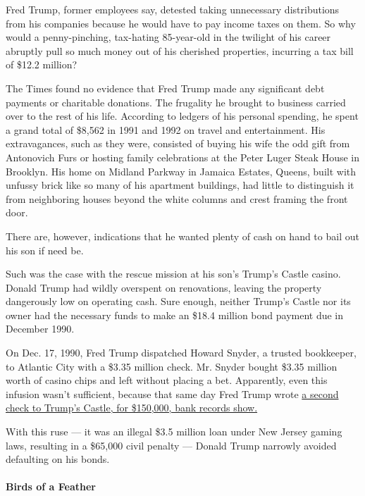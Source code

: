 Fred Trump, former employees say, detested taking unnecessary
distributions from his companies because he would have to pay income
taxes on them. So why would a penny-pinching, tax-hating 85-year-old in
the twilight of his career abruptly pull so much money out of his
cherished properties, incurring a tax bill of \$12.2 million?

The Times found no evidence that Fred Trump made any significant debt
payments or charitable donations. The frugality he brought to business
carried over to the rest of his life. According to ledgers of his
personal spending, he spent a grand total of \$8,562 in 1991 and 1992 on
travel and entertainment. His extravagances, such as they were,
consisted of buying his wife the odd gift from Antonovich Furs or
hosting family celebrations at the Peter Luger Steak House in Brooklyn.
His home on Midland Parkway in Jamaica Estates, Queens, built with
unfussy brick like so many of his apartment buildings, had little to
distinguish it from neighboring houses beyond the white columns and
crest framing the front door.

There are, however, indications that he wanted plenty of cash on hand to
bail out his son if need be.

Such was the case with the rescue mission at his son's Trump's Castle
casino. Donald Trump had wildly overspent on renovations, leaving the
property dangerously low on operating cash. Sure enough, neither Trump's
Castle nor its owner had the necessary funds to make an \$18.4 million
bond payment due in December 1990.

On Dec. 17, 1990, Fred Trump dispatched Howard Snyder, a trusted
bookkeeper, to Atlantic City with a \$3.35 million check. Mr. Snyder
bought \$3.35 million worth of casino chips and left without placing a
bet. Apparently, even this infusion wasn't sufficient, because that same
day Fred Trump wrote
\href{https://int.nyt.com/data/documenthelper/344-trumps-castle-statement/2ed81084d70858cfbb17/optimized/full.pdf\#page=1}{a
second check to Trump's Castle, for \$150,000, bank records show.}

With this ruse --- it was an illegal \$3.5 million loan under New Jersey
gaming laws, resulting in a \$65,000 civil penalty --- Donald Trump
narrowly avoided defaulting on his bonds.

\hypertarget{birds-of-a-feather}{%
\paragraph{Birds of a Feather}\label{birds-of-a-feather}}


